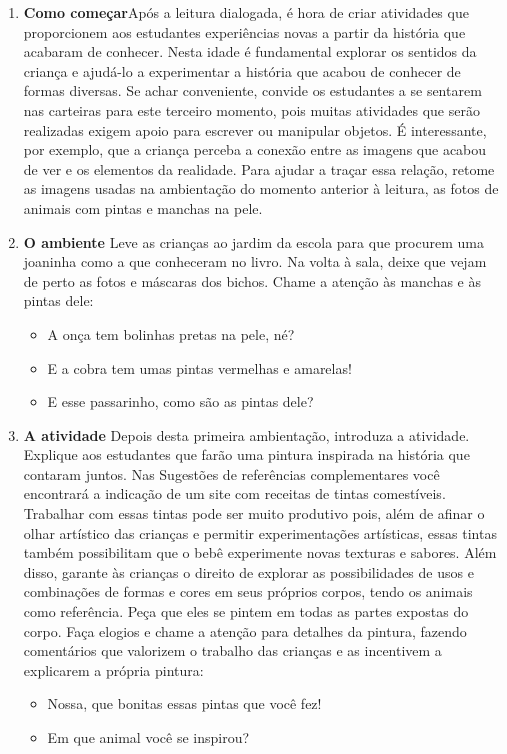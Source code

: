 \documentclass[11pt]{extarticle}
\begin{document}
\begin{enumerate}
\item \textbf{Como começar}\quad Após a leitura dialogada, é hora de criar 
atividades que proporcionem aos estudantes experiências novas a partir da história 
que acabaram de conhecer. Nesta idade é fundamental explorar os sentidos da criança e 
ajudá-lo a experimentar a história que acabou de conhecer de formas diversas. Se achar 
conveniente, convide os estudantes a se sentarem nas carteiras para este terceiro 
momento, pois muitas atividades que serão realizadas exigem apoio para escrever 
ou manipular objetos. É interessante, por exemplo, que a criança perceba a conexão 
entre as imagens que acabou de ver e os elementos da realidade. Para ajudar a traçar 
essa relação, retome as imagens usadas na ambientação do momento anterior à leitura, as
fotos de animais com pintas e manchas na pele. 

\item \textbf{O ambiente}\quad 
Leve as crianças ao jardim da escola para que procurem uma joaninha 
como a que conheceram no livro. Na volta à sala, deixe que vejam de perto as fotos e máscaras dos bichos. 
Chame a atenção às manchas e às pintas dele:
\begin{itemize}
\item A onça tem bolinhas pretas na pele, né?
\item E a cobra tem umas pintas vermelhas e amarelas!
\item E esse passarinho, como são as pintas dele?
\end{itemize}

\item \textbf{A atividade}\quad 
Depois desta primeira ambientação, introduza a atividade. 
Explique aos estudantes que farão uma pintura inspirada na história 
que contaram juntos. Nas Sugestões de referências complementares você encontrará 
a indicação de um site com receitas de tintas comestíveis. Trabalhar com essas 
tintas pode ser muito produtivo pois, além de afinar o olhar artístico das crianças e 
permitir experimentações artísticas, essas tintas também possibilitam que o 
bebê experimente novas texturas e sabores. Além disso, garante às crianças
o direito de explorar as possibilidades de usos e combinações de formas e cores
em seus próprios corpos, tendo os animais como referência. 
Peça que eles se pintem em todas as partes expostas do corpo. 
Faça elogios e chame 
a atenção para detalhes da pintura, fazendo comentários que valorizem o 
trabalho das crianças e as incentivem a explicarem 
a própria pintura: 
\begin{itemize}
\item Nossa, que bonitas essas pintas que você fez!
\item Em que animal você se inspirou?
\end{itemize}


\end{enumerate}
\end{document}
